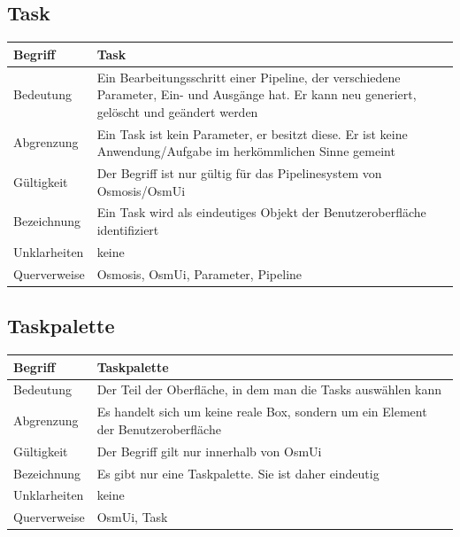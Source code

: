 \documentclass[a4paper,12pt]{scrartcl}
\begin{document}
\begin{center}
\subsection{Task}
\begin{tabular}{|p{5cm}|p{10cm}|}
\hline Begriff & \textbf{Task} \\ 
\hline Bedeutung & Ein Bearbeitungsschritt einer Pipeline, der verschiedene Parameter, Ein- und Ausgänge hat. Er kann neu generiert, gelöscht und geändert werden\\ 
\hline Abgrenzung & Ein Task ist kein Parameter, er besitzt diese. Er ist keine Anwendung/Aufgabe im herkömmlichen Sinne gemeint\\ 
\hline Gültigkeit & Der Begriff ist nur gültig für das Pipelinesystem von Osmosis/OsmUi\\ 
\hline Bezeichnung & Ein Task wird als eindeutiges Objekt der Benutzeroberfläche identifiziert\\ 
\hline Unklarheiten & keine \\ 
\hline Querverweise & Osmosis, OsmUi, Parameter, Pipeline\\ 
\hline 
\end{tabular}
\subsection{Taskpalette}
\begin{tabular}{|p{5cm}|p{10cm}|}
\hline Begriff & \textbf{Taskpalette} \\ 
\hline Bedeutung & Der Teil der Oberfläche, in dem man die Tasks auswählen kann  \\ 
\hline Abgrenzung & Es handelt sich um keine reale Box, sondern um ein Element der Benutzeroberfläche\\ 
\hline Gültigkeit & Der Begriff gilt nur innerhalb von OsmUi \\ 
\hline Bezeichnung & Es gibt nur eine Taskpalette. Sie ist daher eindeutig \\ 
\hline Unklarheiten & keine \\ 
\hline Querverweise & OsmUi, Task\\ 
\hline 
\end{tabular}

\end{center}
\end{document}
